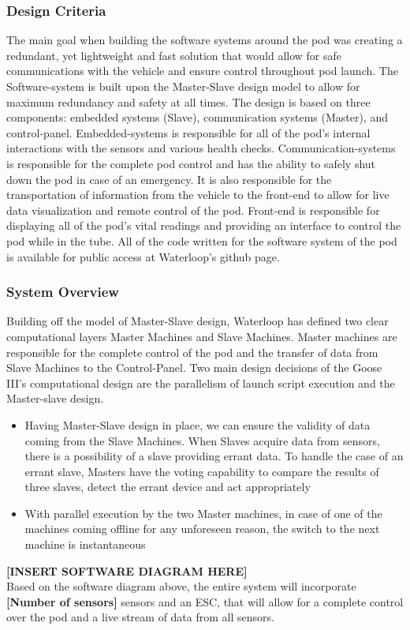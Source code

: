 \documentclass{report}
\begin{document}
    \subsubsection{Design Criteria}
    The main goal when building the software systems around the pod was creating a redundant, yet lightweight and fast solution that would allow for safe communications with the vehicle and ensure control throughout pod launch. The Software-system is built upon the Master-Slave design model to allow for maximum redundancy and safety at all times. The design is based on three components: embedded systems (Slave), communication systems (Master), and control-panel. Embedded-systems is responsible for all of the pod’s internal interactions with the sensors and various health checks. Communication-systems is responsible for the complete pod control and has the ability to safely shut down the pod in case of an emergency. It is also responsible for the transportation of information from the vehicle to the front-end to allow for live data visualization and remote control of the pod. Front-end is responsible for displaying all of the pod’s vital readings and providing an interface to control the pod while in the tube. All of the code written for the software system of the pod is available for public access at Waterloop’s github page.
    \subsubsection{System Overview}
    Building off the model of Master-Slave design, Waterloop has defined two clear computational layers Master Machines and Slave Machines. Master machines are responsible for the complete control of the pod and the transfer of data from Slave Machines to the Control-Panel. Two main design decisions of the Goose III’s computational design are the parallelism of launch script execution and the Master-slave design.
    \begin{itemize}
        \item Having Master-Slave design in place, we can ensure the validity of data coming from the Slave Machines. When Slaves acquire data from sensors, there is a possibility of a slave providing errant data. To handle the case of an errant slave, Masters have the voting capability to compare the results of three slaves, detect the errant device and act appropriately
        \item With parallel execution by the two Master machines, in case of one of the machines coming offline for any unforeseen reason, the switch to the next machine is instantaneous
    \end{itemize}
    \textbf{[INSERT SOFTWARE DIAGRAM HERE]}\\
    Based on the software diagram above, the entire system will incorporate \textbf{[Number of sensors]} sensors and an ESC, that will allow for a complete control over the pod and a live stream of data from all sensors.
\end{document}
